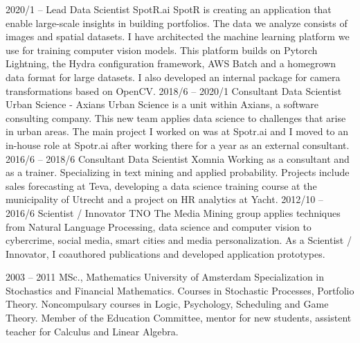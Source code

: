 \documentclass[8pt]{developercv} %
\begin{document}
\begin{entrylist}
	\entry
		{2020/1 -- }
		{Lead Data Scientist}
		{SpotR.ai}
		{SpotR is creating an application that enable large-scale insights in building portfolios. The data we analyze consists of images and spatial datasets. I have architected the machine learning platform we use for training computer vision models. This platform builds on Pytorch Lightning, the Hydra configuration framework, AWS Batch and a homegrown data format for large datasets. I also developed an internal package for camera transformations based on OpenCV. }
	\entry
		{2018/6 -- 2020/1}
		{Consultant Data Scientist}
		{Urban Science - Axians}
		{Urban Science is a unit within Axians, a software consulting company. This new team applies data science to challenges that arise in urban areas. The main project I worked on was at Spotr.ai and I moved to an in-house role at Spotr.ai after working there for a year as an external consultant.}
	\entry
    {2016/6 -- 2018/6}
		{Consultant Data Scientist}
		{Xomnia}
		{Working as a consultant and as a trainer. Specializing in text mining and applied probability. Projects include sales forecasting at Teva, developing a data science training course at the municipality of Utrecht and a project on HR analytics at Yacht.}
  \entry
		{2012/10 -- 2016/6}
		{Scientist / Innovator}
		{TNO}
		{The Media Mining group applies techniques from Natural Language Processing, data science and computer vision to cybercrime, social media, smart cities and media personalization. As a Scientist / Innovator, I coauthored publications and developed application prototypes.}
\end{entrylist}



\begin{entrylist}
	\entry
		{2003 -- 2011}
		{MSc., Mathematics}
		{University of Amsterdam}
		{Specialization in Stochastics and Financial Mathematics. Courses in Stochastic Processes, Portfolio Theory. Noncompulsary courses in Logic, Psychology, Scheduling and Game Theory. Member of the Education Committee, mentor for new students, assistent teacher for Calculus and Linear Algebra.
    }
\end{entrylist}
\end{document}
